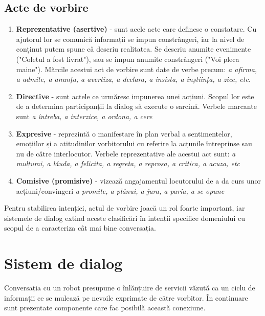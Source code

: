 \subsection{Acte de vorbire}
\begin{enumerate}
	\item \textbf{Reprezentative (asertive)} - sunt acele acte care definesc o constatare. Cu ajutorul lor se comunică informații se impun constrângeri, iar la nivel de conținut putem spune că descriu realitatea. Se descriu anumite evenimente ("Coletul a fost livrat"), sau se impun anumite constrângeri ("Voi pleca maine"). Mărcile acestui act de vorbire sunt date de verbe precum: \textit{a afirma, a admite, a anunța, a avertiza, a declara, a insista, a înștiința, a zice, etc}.

	\item \textbf{Directive} - sunt actele ce urmăresc impunerea unei acțiuni. Scopul lor este de a determina participanții la dialog să execute o sarcină. Verbele marcante sunt \textit{a întreba, a interzice, a ordona, a cere}
	
	\item \textbf{Expresive} -  reprezintă o manifestare în plan verbal a sentimentelor, emoțiilor și a atitudinilor vorbitorului cu referire la acțunile întreprinse sau nu de către interlocutor. Verbele reprezentative ale acestui act sunt: \textit{a mulțumi, a lăuda, a felicita, a regreta, a reproșa, a critica, a acuza, etc}
	
	\item \textbf{Comisive (promisive)} - vizează angajamentul locutorului de a da curs unor acțiuni/convingeri \textit{a promite, a plănui, a jura, a paria, a se opune}
\end{enumerate}

Pentru stabilirea intenției, actul de vorbire joacă un rol foarte important, iar sistemele de dialog extind aceste clasificări în intenții specifice domeniului cu scopul de a caracteriza cât mai bine conversația.


\section{Sistem de dialog}
Conversația cu un robot presupune o înlănțuire de servicii văzută ca un ciclu de informații ce se mulează pe nevoile exprimate de către vorbitor. În continuare sunt prezentate componente care fac posibilă această conexiune.
